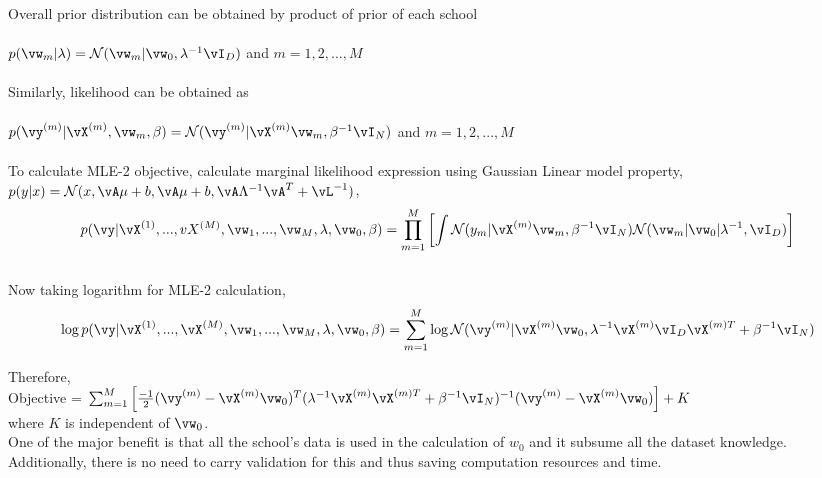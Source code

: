 \documentclass[a4paper,11pt]{article}
\begin{document}
\begin{pmisolution}
Overall prior distribution can be obtained by product of prior of each school\\\\ \(p(\vw_{m}|\lambda) = \mathcal{N}(\vw_{m}| \vw_{0}, \lambda^{-1}\vI_{D}) \) and \(m = 1,2,...,M\)\\
\\
Similarly, likelihood can be obtained as\\
\\
\(p(\vy^{(m)}|\vX^{(m)},\vw_{m}, \beta) = \mathcal{N}(\vy^{(m)}|\vX^{(m)}\vw_{m}, \beta^{-1}\vI_{N}) \) and \(m = 1,2,...,M\) \\
\\
To calculate MLE-2 objective, calculate marginal likelihood expression using Gaussian Linear model property, \\
\(p(y|x) = \mathcal{N}(x,\vA\mu + b, \vA\mu+b,\vA\Lambda^{-1}\vA^{T}+\vL^{-1})\),
\\
\[p(\vy|\vX^{(1)},...,vX^{(M)},\vw_{1},...,\vw_{M}, \lambda,\vw_{0},\beta) = \prod_{m=1}^{M} \left[\int  \mathcal{N}(y_{m}|\vX^{(m)}\vw_{m}, \beta^{-1}\vI_{N}) \mathcal{N}(\vw_{m}| \vw_{0}| \lambda^{-1}, \vI_{D})\right]\]
\\
Now taking logarithm for MLE-2 calculation,\\
\[\log p(\vy|\vX^{(1)},...,\vX^{(M)},\vw_{1},...,\vw_{M}, \lambda,\vw_{0},\beta) = \sum_{m=1}^{M} \log \mathcal{N}(\vy^{(m)}|\vX^{(m)}\vw_{0},\lambda^{-1}\vX^{(m)}\vI_{D}\vX^{(m)T} + \beta^{-1}\vI_{N})\]

Therefore, \\
Objective = \(\sum_{m=1}^{M} \left[ \frac{-1}{2} (\vy^{(m)} - \vX^{(m)}\vw_{0})^{T}(\lambda^{-1}\vX^{(m)}\vX^{(m)T} + \beta^{-1}\vI_{N})^{-1}(\vy^{(m)} - \vX^{(m)}\vw_{0}) \right] + K\)\\
 where \(K\) is independent of \(\vw_{0}\). \\

One of the major benefit is that all the school's data is used in the calculation of \(w_{0}\) and it subsume all the dataset knowledge. Additionally, there is no need to carry validation for this and thus saving computation resources and time.
\end{pmisolution}
\end{document}
